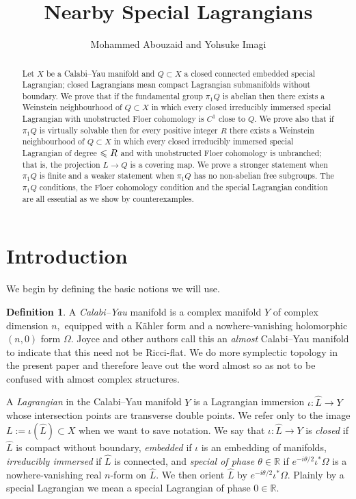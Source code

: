 \documentclass{article}
\title{Nearby Special Lagrangians}
\author{Mohammed Abouzaid and Yohsuke Imagi}
\theoremstyle{plain}%
\theoremstyle{definition}
\newtheorem{dfn}[thm]{Definition}
\numberwithin{equation}{section}
\numberwithin{figure}{section}
\def\l{\label}
\def\le{\leqslant\nobreak}
\def\R{{\mathbin{\mathbb R}}}
\def\io{\iota}
\def\th{\theta}
\def\Om{\Omega}
\begin{document}
\maketitle
\begin{abstract}
Let $X$ be a Calabi--Yau manifold and $Q\subset X$ a closed connected embedded special Lagrangian; closed Lagrangians mean compact Lagrangian submanifolds without boundary. We prove that if the fundamental group $\pi_1Q$ is abelian then there exists a Weinstein neighbourhood of $Q\subset X$ in which every closed irreducibly immersed special Lagrangian with unobstructed Floer cohomology is $C^1$ close to $Q.$ We prove also that if $\pi_1Q$ is virtually solvable then for every positive integer $R$ there exists a Weinstein neighbourhood of $Q\subset X$ in which every closed irreducibly immersed special Lagrangian of degree $\le R$ and with unobstructed Floer cohomology is unbranched; that is, the projection $L\to Q$ is a covering map. We prove a stronger statement when $\pi_1Q$ is finite and a weaker statement when $\pi_1Q$ has no non-abelian free subgroups. The $\pi_1Q$ conditions, the Floer cohomology condition and the special Lagrangian condition are all essential as we show by counterexamples.
\end{abstract}
\setcounter{tocdepth}{1}
\tableofcontents
\section{Introduction}
We begin by defining the basic notions we will use. 
\begin{dfn}\l{dfn: sLag}
A {\it Calabi--Yau} manifold is a complex manifold $Y$ of complex dimension $n,$ equipped with a K\"ahler form and a nowhere-vanishing holomorphic $(n,0)$ form $\Om.$ Joyce \cite{J5} and other authors call this an {\it almost} Calabi--Yau manifold to indicate that this need not be Ricci-flat. We do more symplectic topology in the present paper and therefore leave out the word almost so as not to be confused with almost complex structures.

A {\it Lagrangian} in the Calabi--Yau manifold $Y$ is a Lagrangian immersion $\io:\hat L\to Y$ whose intersection points are transverse double points. We refer only to the image $L:=\io(\hat L)\subset X$ when we want to save notation. We say that $\io:\hat L\to Y$ is {\it closed} if $\hat L$ is compact without boundary, {\it embedded} if $\io$ is an embedding of manifolds, {\it irreducibly immersed} if $\hat L$ is connected, and {\it special of phase $\th\in\R$} if $e^{-i\th/2}\io^*\Om$ is a nowhere-vanishing real $n$-form on $\hat L.$ We then orient $\hat L$ by $e^{-i\th/2}\io^*\Om.$ Plainly by a special Lagrangian we mean a special Lagrangian of phase $0\in\R.$ 
\end{dfn}
\end{document}
